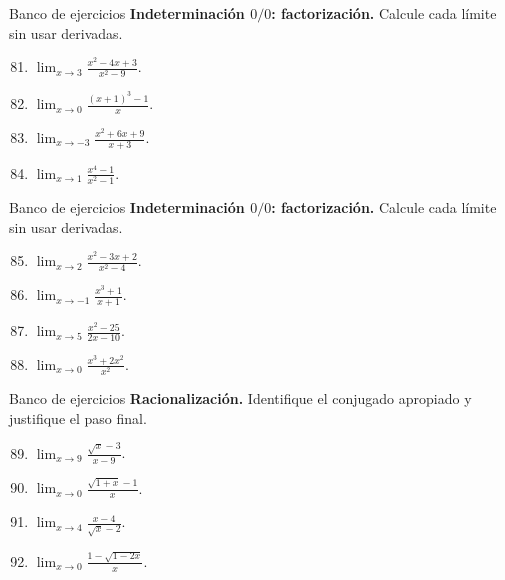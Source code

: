\documentclass[12pt,aspectratio=169]{beamer}
\begin{document}
\begin{frame}[t,allowframebreaks]{Banco de ejercicios}
\small
\noindent \textbf{Indeterminación $0/0$: factorización.} Calcule cada límite sin usar derivadas.\par\smallskip
\begin{enumerate}\setcounter{enumi}{80}
\item $\displaystyle\lim_{x\to3}\frac{x^2-4x+3}{x^2-9}$.
\item $\displaystyle\lim_{x\to0}\frac{(x+1)^3-1}{x}$.
\item $\displaystyle\lim_{x\to-3}\frac{x^2+6x+9}{x+3}$.
\item $\displaystyle\lim_{x\to1}\frac{x^4-1}{x^2-1}$.
\end{enumerate}
\end{frame}


\begin{frame}[t,allowframebreaks]{Banco de ejercicios}
\small
\noindent \textbf{Indeterminación $0/0$: factorización.} Calcule cada límite sin usar derivadas.\par\smallskip
\begin{enumerate}\setcounter{enumi}{84}
\item $\displaystyle\lim_{x\to2}\frac{x^2-3x+2}{x^2-4}$.
\item $\displaystyle\lim_{x\to-1}\frac{x^3+1}{x+1}$.
\item $\displaystyle\lim_{x\to5}\frac{x^2-25}{2x-10}$.
\item $\displaystyle\lim_{x\to0}\frac{x^3+2x^2}{x^2}$.
\end{enumerate}
\end{frame}


\begin{frame}[t,allowframebreaks]{Banco de ejercicios}
\small
\noindent \textbf{Racionalización.} Identifique el conjugado apropiado y justifique el paso final.\par\smallskip
\begin{enumerate}\setcounter{enumi}{88}
\item $\displaystyle\lim_{x\to9}\frac{\sqrt{x}-3}{x-9}$.
\item $\displaystyle\lim_{x\to0}\frac{\sqrt{1+x}-1}{x}$.
\item $\displaystyle\lim_{x\to4}\frac{x-4}{\sqrt{x}-2}$.
\item $\displaystyle\lim_{x\to0}\frac{1-\sqrt{1-2x}}{x}$.
\end{enumerate}
\end{frame}
\end{document}
